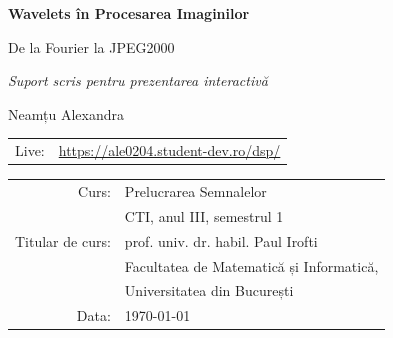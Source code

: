 \documentclass[11pt,a4paper,oneside]{report}
\begin{document}
\begin{titlepage}
\centering
\vspace*{2cm}
{\Huge\bfseries Wavelets în Procesarea Imaginilor\par}
\vspace{0.6cm}
{\Large De la Fourier la JPEG2000\par}
\vspace{1.6cm}
{\large\itshape Suport scris pentru prezentarea interactivă\par}
\vspace{1.8cm}

{\Large Neamțu Alexandra\par}
\vspace{0.9cm}

\begin{tabular}{rl}
Live: & \url{https://ale0204.student-dev.ro/dsp/} \\
\end{tabular}

\vfill

\begin{tabular}{rl}
Curs: & Prelucrarea Semnalelor \\[2mm]
      & CTI, anul III, semestrul 1 \\[3mm]
Titular de curs: & prof. univ. dr. habil. Paul Irofti \\[2mm]
      & Facultatea de Matematică și Informatică, \\[1mm]
      & Universitatea din București \\[3mm]
Data: & \today \\
\end{tabular}

\vspace{1.5cm}
\end{titlepage}

\tableofcontents
\listoffigures












\end{document}
